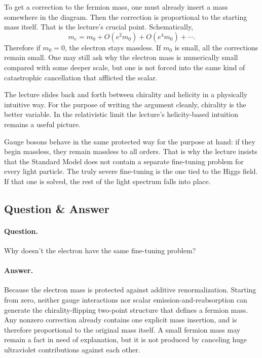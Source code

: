 To get a correction to the fermion mass, one must already insert a mass somewhere in the diagram. Then the correction is proportional to the starting mass itself. That is the lecture's crucial point. Schematically,
\begin{equation}
m_e=m_0+O(e^2m_0)+O(e^4m_0)+\cdots.
\end{equation}
Therefore if \(m_0=0\), the electron stays massless. If \(m_0\) is small, all the corrections remain small. One may still ask why the electron mass is numerically small compared with some deeper scale, but one is not forced into the same kind of catastrophic cancellation that afflicted the scalar.

\begin{remark}
The lecture slides back and forth between chirality and helicity in a physically intuitive way. For the purpose of writing the argument cleanly, chirality is the better variable. In the relativistic limit the lecture's helicity-based intuition remains a useful picture.
\end{remark}

Gauge bosons behave in the same protected way for the purpose at hand: if they begin massless, they remain massless to all orders. That is why the lecture insists that the Standard Model does not contain a separate fine-tuning problem for every light particle. The truly severe fine-tuning is the one tied to the Higgs field. If that one is solved, the rest of the light spectrum falls into place.

\subsection{Question \& Answer}

\paragraph{Question.} Why doesn't the electron have the same fine-tuning problem?

\paragraph{Answer.} Because the electron mass is protected against additive renormalization. Starting from zero, neither gauge interactions nor scalar emission-and-reabsorption can generate the chirality-flipping two-point structure that defines a fermion mass. Any nonzero correction already contains one explicit mass insertion, and is therefore proportional to the original mass itself. A small fermion mass may remain a fact in need of explanation, but it is not produced by canceling huge ultraviolet contributions against each other.

